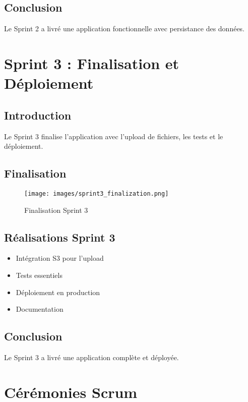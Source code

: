 \begin{table}[H]
\subsection{Conclusion}

Le Sprint 2 a livré une application fonctionnelle avec persistance des données.

\section{Sprint 3 : Finalisation et Déploiement}

\subsection{Introduction}

Le Sprint 3 finalise l'application avec l'upload de fichiers, les tests et le déploiement.

\subsection{Finalisation}

\begin{figure}[H]
    \centering
    \texttt{[image: images/sprint3\_finalization.png]}
    \caption{Finalisation Sprint 3}
    \label{fig:sprint3_final}
\end{figure}

\subsection{Réalisations Sprint 3}

\begin{itemize}
    \item Intégration S3 pour l'upload
    \item Tests essentiels
    \item Déploiement en production
    \item Documentation
\end{itemize}

\subsection{Conclusion}

Le Sprint 3 a livré une application complète et déployée.

\section{Cérémonies Scrum}


\end{table}
